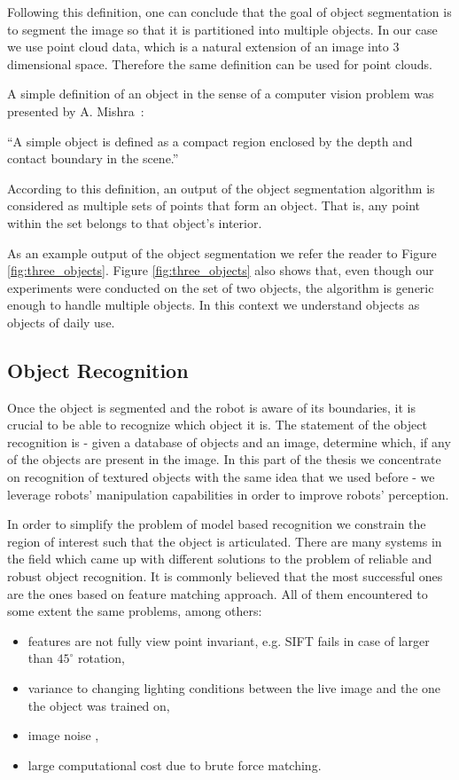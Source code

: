  Following this definition, one can conclude that the goal of object segmentation is to segment the image so that it is partitioned into multiple objects. In our case we use point cloud data, which is a natural extension of an image into 3 dimensional space. Therefore the same definition can be used for point clouds. 

A simple definition of an object in the sense of a computer vision problem was presented by A. Mishra~\cite{mishra2012segmenting}:

\noindent ``A simple object is defined as a compact region enclosed by the depth and
contact boundary in the scene.''

According to this definition, an output of the object segmentation algorithm is considered as multiple sets of points that form an object. That is, any point within the set belongs to that object's interior. 

As an example output of the object segmentation we refer the reader to Figure \ref{fig:three_objects}. Figure \ref{fig:three_objects} also shows that, even though our experiments were conducted on the set of two objects, the algorithm is generic enough to handle multiple objects. In this context we understand objects as objects of daily use.


\subsection{Object Recognition}

Once the object is segmented and the robot is aware of its boundaries, it is crucial to be able to recognize which object it is. The statement of the object recognition is -  
given a database of objects and an image, determine which, if any of the objects are present in the image. In this part of the thesis we concentrate on recognition of textured objects with the same idea that we used before - we leverage robots' manipulation capabilities in order to improve robots' perception.

In order to simplify the problem of model based recognition we constrain the region of interest such that the object is articulated. There are many systems in the field which came up with different solutions to the problem of reliable and robust object recognition. It is commonly believed that the most successful ones are the ones based on feature matching approach. All of them encountered to some extent the same problems, among others:

\begin{itemize}
\item features are not fully view point invariant, e.g. SIFT fails in case of larger than
$45^\circ$ rotation,
\item  variance to changing lighting conditions between the live
image and the one the object was trained on,
\item image noise ,
\item large computational cost due to brute force matching.
\end{itemize}

